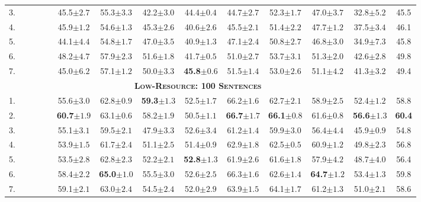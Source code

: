 \documentclass[11pt,a4paper]{article}
\newcommand{\cmark}{\textcolor{blue}{\ding{51}}}
\newcommand{\xmark}{\textcolor{red}{\ding{55}}}
\begin{document}
\begin{table*}[t]
\begin{tabular}{l|cccc||cccccccc|c}
3. & \cmark & \xmark & \xmark & \xmark & 45.5$\pm2.7$ & 55.3$\pm3.3$ & 42.2$\pm3.0$ & 44.4$\pm0.4$ & 44.7$\pm2.7$ & 52.3$\pm1.7$ & 47.0$\pm3.7$ & 32.8$\pm5.2$ & 45.5 \\
4. & \cmark & \xmark & \cmark & \xmark & 45.9$\pm1.2$ & 54.6$\pm1.3$ & 45.3$\pm2.6$ & 40.6$\pm2.6$ & 45.5$\pm2.1$ & 51.4$\pm2.2$ & 47.7$\pm1.2$ & 37.5$\pm3.4$ & 46.1 \\
5. & \cmark & \xmark & \cmark & \cmark & 44.1$\pm4.4$ & 54.8$\pm1.7$ & 47.0$\pm3.5$ & 40.9$\pm1.3$ & 47.1$\pm2.4$ & 50.8$\pm2.7$ & 46.8$\pm3.0$ & 34.9$\pm7.3$ & 45.8 \\
6. & \cmark & \cmark & \cmark & \xmark & 48.2$\pm4.7$ & 57.9$\pm2.3$ & 51.6$\pm1.8$ & 41.7$\pm0.5$ & 51.0$\pm2.7$ & 53.7$\pm3.1$ & 51.3$\pm2.0$ & 42.6$\pm2.8$ & 49.8 \\
7. & \cmark & \cmark & \cmark & \cmark & 45.0$\pm6.2$ & 57.1$\pm1.2$ & 50.0$\pm3.3$ & \textbf{45.8}$\pm0.6$ & 51.5$\pm1.4$ & 53.0$\pm2.6$ & 51.1$\pm4.2$ & 41.3$\pm3.2$ & 49.4 \\
\hline\hline
\multicolumn{13}{c}{\bf \textsc{Low-Resource: 100 Sentences}}\\
\hline
1. & \xmark & \cmark & \xmark & \xmark & 55.6$\pm3.0$ & 62.8$\pm0.9$ & \textbf{59.3}$\pm1.3$ & 52.5$\pm1.7$ & 66.2$\pm1.6$ & 62.7$\pm2.1$ & 58.9$\pm2.5$ & 52.4$\pm1.2$ & 58.8 \\
2. & \xmark & \cmark & \cmark & \xmark & \textbf{60.7}$\pm1.9$ & 63.1$\pm0.6$ & 58.2$\pm1.9$ & 50.5$\pm1.1$ & \textbf{66.7}$\pm1.7$ & \textbf{66.1}$\pm0.8$ & 61.6$\pm0.8$ & \textbf{56.6}$\pm1.3$ & \textbf{60.4} \\
3. & \cmark & \xmark & \xmark & \xmark & 55.1$\pm3.1$ & 59.5$\pm2.1$ & 47.9$\pm3.3$ & 52.6$\pm3.4$ & 61.2$\pm1.4$ & 59.9$\pm3.0$ & 56.4$\pm4.4$ & 45.9$\pm0.9$ & 54.8 \\
4. & \cmark & \xmark & \cmark & \xmark & 53.9$\pm1.5$ & 61.7$\pm2.4$ & 51.1$\pm2.5$ & 51.4$\pm0.9$ & 62.9$\pm1.8$ & 62.5$\pm0.5$ & 60.9$\pm1.2$ & 49.8$\pm2.3$ & 56.8 \\
5. & \cmark & \xmark & \cmark & \cmark & 53.5$\pm2.8$ & 62.8$\pm2.3$ & 52.2$\pm2.1$ & \textbf{52.8}$\pm1.3$ & 61.9$\pm2.6$ & 61.6$\pm1.8$ & 57.9$\pm4.2$ & 48.7$\pm4.0$ & 56.4 \\
6. & \cmark & \cmark & \cmark & \xmark & 58.4$\pm2.2$ & \textbf{65.0}$\pm1.0$ & 55.5$\pm3.0$ & 52.6$\pm2.5$ & 66.3$\pm1.6$ & 62.6$\pm1.4$ & \textbf{64.7}$\pm1.2$ & 53.4$\pm1.3$ & 59.8 \\
7. & \cmark & \cmark & \cmark & \cmark & 59.1$\pm2.1$ & 63.0$\pm2.4$ & 54.5$\pm2.4$ & 52.0$\pm2.9$ & 63.9$\pm1.5$ & 64.1$\pm1.7$ & 61.2$\pm1.3$ & 51.0$\pm2.1$ & 58.6 \\

\end{tabular}
\end{table*}
\end{document}
